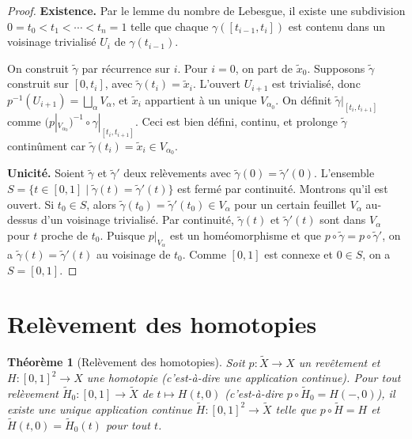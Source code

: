 \documentclass[12pt,a4paper,openany]{book}
\theoremstyle{definition}
\theoremstyle{plain}
\newtheorem{theoreme}[definition]{Théorème}
\theoremstyle{remark}
\begin{document}
\begin{proof}
\textbf{Existence.}
Par le lemme du nombre de Lebesgue, il existe une
subdivision $0 = t_0 < t_1 < \cdots < t_n = 1$ telle que chaque $\gamma([t_{i-1}, t_i])$
est contenu dans un voisinage trivialisé $U_i$ de $\gamma(t_{i-1})$.

On construit $\tilde{\gamma}$ par récurrence sur $i$. Pour $i = 0$, on part de
$\tilde{x}_0$. Supposons $\tilde{\gamma}$ construit sur $[0, t_i]$, avec
$\tilde{\gamma}(t_i) = \tilde{x}_i$. L'ouvert $U_{i+1}$ est trivialisé, donc
$p^{-1}(U_{i+1}) = \bigsqcup_\alpha V_\alpha$, et $\tilde{x}_i$ appartient à un unique
$V_{\alpha_0}$. On définit $\tilde{\gamma}|_{[t_i, t_{i+1}]}$ comme
$(p|_{V_{\alpha_0}})^{-1} \circ \gamma|_{[t_i, t_{i+1}]}$. Ceci est bien défini, continu,
et prolonge $\tilde{\gamma}$ continûment car $\tilde{\gamma}(t_i) = \tilde{x}_i \in V_{\alpha_0}$.

\textbf{Unicité.}
Soient $\tilde{\gamma}$ et $\tilde{\gamma}'$ deux relèvements avec $\tilde{\gamma}(0)
= \tilde{\gamma}'(0)$. L'ensemble $S = \{t \in [0,1] \mid \tilde{\gamma}(t) = \tilde{\gamma}'(t)\}$
est fermé par continuité. Montrons qu'il est ouvert. Si $t_0 \in S$, alors
$\tilde{\gamma}(t_0) = \tilde{\gamma}'(t_0) \in V_\alpha$ pour un certain feuillet $V_\alpha$
au-dessus d'un voisinage trivialisé. Par continuité, $\tilde{\gamma}(t)$ et
$\tilde{\gamma}'(t)$ sont dans $V_\alpha$ pour $t$ proche de $t_0$. Puisque
$p|_{V_\alpha}$ est un homéomorphisme et que $p \circ \tilde{\gamma} = p \circ \tilde{\gamma}'$,
on a $\tilde{\gamma}(t) = \tilde{\gamma}'(t)$ au voisinage de $t_0$.
Comme $[0,1]$ est connexe et $0 \in S$, on a $S = [0,1]$.
\end{proof}

\section{Relèvement des homotopies}\label{sec:relevement-homotopies}

\begin{theoreme}[Relèvement des homotopies]\label{thm:relevement-homotopies}
Soit $p \colon \widetilde{X} \to X$ un revêtement et
$H \colon [0,1]^2 \to X$ une homotopie (c'est-à-dire une application continue).
Pour tout relèvement $\tilde{H}_0 \colon [0,1] \to \widetilde{X}$ de $t \mapsto H(t, 0)$
(c'est-à-dire $p \circ \tilde{H}_0 = H(-,0)$), il existe une unique application continue
$\widetilde{H} \colon [0,1]^2 \to \widetilde{X}$ telle que $p \circ \widetilde{H} = H$
et $\widetilde{H}(t, 0) = \tilde{H}_0(t)$ pour tout $t$.
\end{theoreme}
\end{document}
